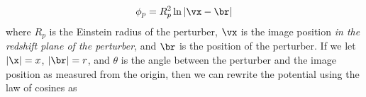 \begin{equation}
\phi_p = R_p^2 \ln \left| \vx - \br \right| 
\end{equation}
where $R_p$ is the Einstein radius of the perturber, $\vx$ is the image position \textit{in the redshift plane of the perturber}, and $\br$ is the position of the perturber. If we let $|\x| = x$, $|\br| = r$, and $\theta$ is the angle between the perturber and the image position as measured from the origin, then we can rewrite the potential using the law of cosines as